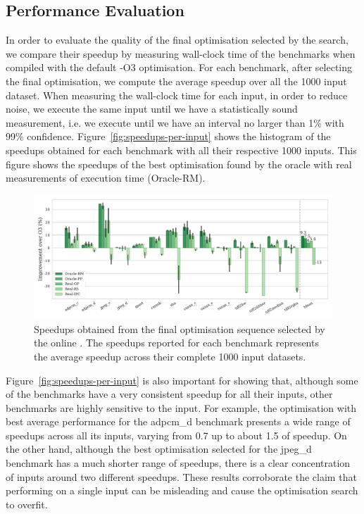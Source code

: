 \subsection{Performance Evaluation}

In order to evaluate the quality of the final optimisation selected by the {\itercomp} search, we compare their speedup by measuring wall-clock time of the benchmarks when compiled with the default {\flagstype -O3} optimisation.
For each benchmark, after selecting the final optimisation, we compute the average speedup over all the 1000 input dataset.
When measuring the wall-clock time for each input, in order to reduce noise, we execute the same input until we have a statistically sound measurement, i.e. we execute until we have an interval no larger than 1\% with 99\% confidence.
Figure~\ref{fig:speedups-per-input} shows the histogram of the speedups obtained for each benchmark with all their respective 1000 inputs.
This figure shows the speedups of the best optimisation found by the oracle with real measurements of execution time (Oracle-RM).

\begin{figure}[htb]
    \centering
    \includegraphics[width=\textwidth]{figs/speedups.pdf}
    \caption{Speedups obtained from the final optimisation sequence selected by the online {\itercomp}.
	         The speedups reported for each benchmark represents the average speedup across their complete 1000 input datasets.}
    \label{fig:speedups}
\end{figure}
 
Figure~\ref{fig:speedups-per-input} is also important for showing that, although some of the benchmarks have a very consistent speedup for all their inputs,
other benchmarks are highly sensitive to the input.
For example, the optimisation with best average performance for the {\flagstype adpcm\_d} benchmark presents a wide range of speedups across all its inputs,
varying from 0.7 up to about 1.5 of speedup.
On the other hand, although the best optimisation selected for the {\flagstype jpeg\_d} benchmark has a much shorter range of speedups, there is a clear concentration of inputs around two different speedups.
These results corroborate the claim that performing {\itercomp} on a single input can be misleading and cause the optimisation search to overfit.

